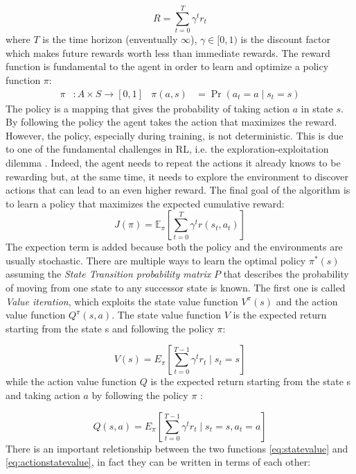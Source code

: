 \begin{equation}
  \label{eq:totalreward}
  R=\sum _{t=0}^{T}\gamma ^{t}r_{t}
\end{equation}
where $T$ is the time horizon (enventually $\infty$), $\gamma \in [0,1)$ is the discount factor which makes future rewards worth less than immediate rewards. The reward function is fundamental to the agent in order to learn and optimize a policy function $\pi$:
\begin{align}
  \displaystyle \pi &:A\times S\rightarrow [0,1] &  \displaystyle \pi (a,s)&=\Pr(a_{t}=a\mid s_{t}=s) \label{eq:label1}
\end{align}
The policy is a mapping that gives the probability of taking action $a$ in state $s$. By following the policy the agent takes the action that maximizes the reward. However, the policy, especially during training, is not deterministic. This is due to one of the fundamental challenges in RL, i.e. the exploration-exploitation dilemma \citep{Sutton1998}. Indeed, the agent needs to repeat the actions it already knows to be rewarding but, at the same time, it needs to explore the environment to discover actions that can lead to an even higher reward. 
The final goal of the algorithm is to learn a policy that maximizes the expected cumulative reward:
\begin{equation}
  \label{eq:rlobj}
  J(\pi)=\mathbb{E}_{\pi}[\sum _{t=0}^{T}\gamma ^{t}r(s_{t},a_{t})]
\end{equation}
The expection term is added because both the policy and the environments are usually stochastic.
There are multiple ways to learn the optimal policy $\pi^{*}(s)$ assuming the \textit{State Transition probability matrix} $P$ that describes the probability of moving from one state to any successor state is known. The first one is called \textit{Value iteration}, which exploits the state value function $V^{\pi}(s)$ and the action value function $Q^{\pi}(s, a)$. The state value function $V$ is the expected return starting from the state s and following the policy $\pi$:

\begin{equation}
  \label{eq:statevalue}
  V(s) = E_{\pi}[\sum_{t=0}^{T-1} \gamma^t r_t \mid s_t=s]
\end{equation}
while the action value function $Q$ is the expected return starting from the state s and taking action $a$ by following the policy $\pi$ :

\begin{equation}
  \label{eq:actionstatevalue}
  Q(s,a) = E_{\pi}[\sum_{t=0}^{T-1} \gamma^t r_t \mid s_t=s, a_t = a]
\end{equation}
There is an important reletionship between the two functions \ref{eq:statevalue} and \ref{eq:actionstatevalue}, in fact they can be written in terms of each other:

